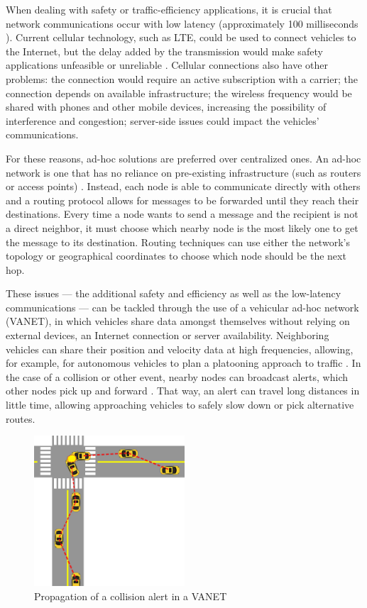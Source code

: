 When dealing with safety or traffic-efficiency applications, it is crucial that network communications occur with low latency (approximately 100 milliseconds \cite{camp2005vehicle}).
Current cellular technology, such as LTE, could be used to connect vehicles to the Internet, but the delay added by the transmission would make safety applications unfeasible or unreliable \cite{mangel2010comparison}.
Cellular connections also have other problems: the connection would require an active subscription with a carrier; the connection depends on available infrastructure; the wireless frequency would be shared with phones and other mobile devices, increasing the possibility of interference and congestion; server-side issues could impact the vehicles' communications.

For these reasons, ad-hoc solutions are preferred over centralized ones.
An ad-hoc network is one that has no reliance on pre-existing infrastructure (such as routers or access points) \cite{wu2004ad}.
Instead, each node is able to communicate directly with others and a routing protocol allows for messages to be forwarded until they reach their destinations.
Every time a node wants to send a message and the recipient is not a direct neighbor, it must choose which nearby node is the most likely one to get the message to its destination.
Routing techniques can use either the network's topology or geographical coordinates \cite{saini2015close} to choose which node should be the next hop.

These issues — the additional safety and efficiency as well as the low-latency communications — can be tackled through the use of a vehicular ad-hoc network (VANET), in which vehicles share data amongst themselves without relying on external devices, an Internet connection or server availability.
Neighboring vehicles can share their position and velocity data at high frequencies, allowing, for example, for autonomous vehicles to plan a platooning approach to traffic \cite{amoozadeh2015platoon}.
In the case of a collision or other event, nearby nodes can broadcast alerts, which other nodes pick up and forward \cite{li2007routing}.
That way, an alert can travel long distances in little time, allowing approaching vehicles to safely slow down or pick alternative routes.

\begin{figure}[h]
    \centering
    \includegraphics[width=0.5\textwidth]{images/collision.png}
    \caption{Propagation of a collision alert in a VANET}
    \label{fig:collision}
\end{figure}

